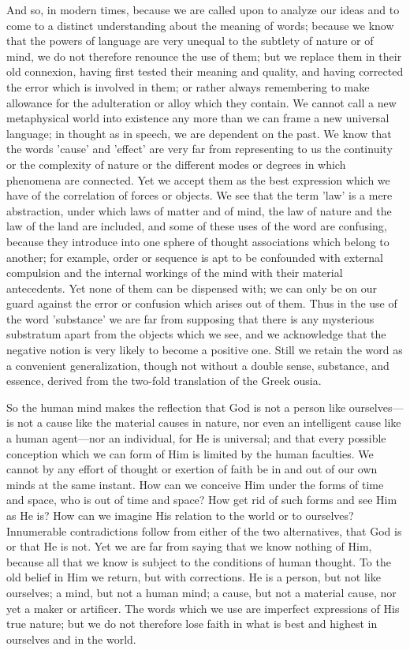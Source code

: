 \documentclass[11pt,letter]{article}
\begin{document}
\par  And so, in modern times, because we are called upon to analyze our ideas and to come to a distinct understanding about the meaning of words; because we know that the powers of language are very unequal to the subtlety of nature or of mind, we do not therefore renounce the use of them; but we replace them in their old connexion, having first tested their meaning and quality, and having corrected the error which is involved in them; or rather always remembering to make allowance for the adulteration or alloy which they contain. We cannot call a new metaphysical world into existence any more than we can frame a new universal language; in thought as in speech, we are dependent on the past. We know that the words 'cause' and 'effect' are very far from representing to us the continuity or the complexity of nature or the different modes or degrees in which phenomena are connected. Yet we accept them as the best expression which we have of the correlation of forces or objects. We see that the term 'law' is a mere abstraction, under which laws of matter and of mind, the law of nature and the law of the land are included, and some of these uses of the word are confusing, because they introduce into one sphere of thought associations which belong to another; for example, order or sequence is apt to be confounded with external compulsion and the internal workings of the mind with their material antecedents. Yet none of them can be dispensed with; we can only be on our guard against the error or confusion which arises out of them. Thus in the use of the word 'substance' we are far from supposing that there is any mysterious substratum apart from the objects which we see, and we acknowledge that the negative notion is very likely to become a positive one. Still we retain the word as a convenient generalization, though not without a double sense, substance, and essence, derived from the two-fold translation of the Greek ousia.

\par  So the human mind makes the reflection that God is not a person like ourselves—is not a cause like the material causes in nature, nor even an intelligent cause like a human agent—nor an individual, for He is universal; and that every possible conception which we can form of Him is limited by the human faculties. We cannot by any effort of thought or exertion of faith be in and out of our own minds at the same instant. How can we conceive Him under the forms of time and space, who is out of time and space? How get rid of such forms and see Him as He is? How can we imagine His relation to the world or to ourselves? Innumerable contradictions follow from either of the two alternatives, that God is or that He is not. Yet we are far from saying that we know nothing of Him, because all that we know is subject to the conditions of human thought. To the old belief in Him we return, but with corrections. He is a person, but not like ourselves; a mind, but not a human mind; a cause, but not a material cause, nor yet a maker or artificer. The words which we use are imperfect expressions of His true nature; but we do not therefore lose faith in what is best and highest in ourselves and in the world.
\end{document}
